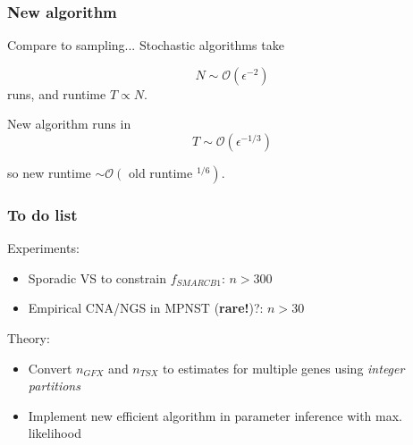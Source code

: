 \documentclass{beamer}
\begin{document}
\begin{frame}
    \frametitle{New algorithm}

    Compare to sampling... Stochastic algorithms take
    
    \begin{equation}
        N \sim \mathcal{O}(\epsilon^{-2})
    \end{equation}
    runs, and runtime $T \propto N$.

    \;

    New algorithm runs in
    \begin{equation}
       T \sim \mathcal{O}(\epsilon^{-1/3})
    \end{equation}

    so new runtime $\sim \mathcal{O}\left(\right.$ old runtime
    $\left.^{1/6}\right)$.

\end{frame}



\begin{frame}
    \frametitle{To do list}

    Experiments:
    \begin{itemize}
        \item Sporadic VS to constrain $f_{SMARCB1}$: $n > 300$
        \item Empirical CNA/NGS in MPNST (\textbf{rare!})?: $n > 30$
    \end{itemize}
    Theory:
    \begin{itemize}
        \item Convert $n_{GFX}$ and $n_{TSX}$ to estimates for multiple genes
        using \emph{integer partitions}
        \item Implement new efficient algorithm in parameter inference with max.
        likelihood 
    \end{itemize}
\end{frame}

%
%
\end{document}
